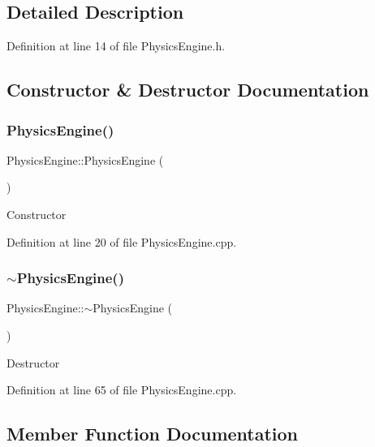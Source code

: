 \subsection{Detailed Description}


Definition at line 14 of file Physics\+Engine.\+h.



\subsection{Constructor \& Destructor Documentation}
\mbox{\label{class_physics_engine_a7fc9180ea453680df0b863fa157c5b92}} 
\subsubsection{\texorpdfstring{Physics\+Engine()}{PhysicsEngine()}}
{\footnotesize\ttfamily Physics\+Engine\+::\+Physics\+Engine (\begin{DoxyParamCaption}{ }\end{DoxyParamCaption})}

Constructor 

Definition at line 20 of file Physics\+Engine.\+cpp.

\mbox{\label{class_physics_engine_ae5f076ee99bbfdbc79ab2d27366d8476}} 
\subsubsection{\texorpdfstring{$\sim$\+Physics\+Engine()}{~PhysicsEngine()}}
{\footnotesize\ttfamily Physics\+Engine\+::$\sim$\+Physics\+Engine (\begin{DoxyParamCaption}{ }\end{DoxyParamCaption})}

Destructor 

Definition at line 65 of file Physics\+Engine.\+cpp.



\subsection{Member Function Documentation}
\mbox{\label{class_physics_engine_a31a8857189ef80c1dc65a09298dcb9bf}} 
